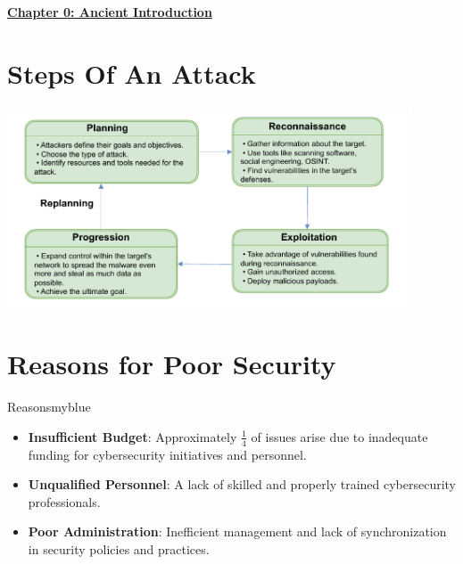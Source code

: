 \begin{center}
    \Huge{\textbf{\underline{Chapter 0: Ancient Introduction}}}
\end{center}

\setcounter{section}{0}

\vspace{0.35cm}

\section{Steps Of An Attack}

\vspace{0.25cm}
\begin{center}
    \includegraphics[width=0.9\textwidth]{Chapters/Diagram/Introduction/attack.drawio.pdf}
\end{center}

\vspace{0.35cm}
\section{Reasons for Poor Security}
\begin{prettyBox}{Reasons}{myblue}
\begin{itemize}
    \item \textbf{Insufficient Budget}: Approximately \(\frac{1}{4}\) of issues arise due to inadequate funding for cybersecurity initiatives and personnel.
    \item \textbf{Unqualified Personnel}: A lack of skilled and properly trained cybersecurity professionals.
    \item \textbf{Poor Administration}: Inefficient management and lack of synchronization in security policies and practices.
\end{itemize}
\end{prettyBox}

\vspace{0.35cm}

